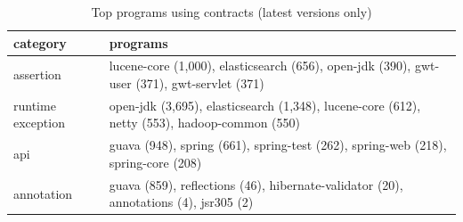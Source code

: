 \begin{table}[]
\centering
\caption{Top programs using contracts (latest versions only)}
\label{tab:topusers}
\begin{tabular}{|p{2.0cm}|p{6.0cm}|} \hline
   category & programs \\ \hline
assertion & lucene-core (1,000), elasticsearch (656), open-jdk (390), gwt-user (371), gwt-servlet (371) \\ 
runtime exception & open-jdk (3,695), elasticsearch (1,348), lucene-core (612), netty (553), hadoop-common (550) \\ 
api & guava (948), spring (661), spring-test (262), spring-web (218), spring-core (208) \\ 
annotation & guava (859), reflections (46), hibernate-validator (20), annotations (4), jsr305 (2) \\ 
\hline
\end{tabular}
\end{table}
